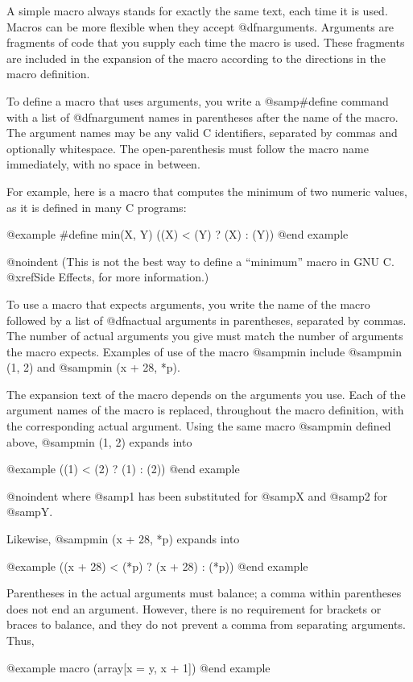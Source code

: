 {A simple macro always stands for exactly the same text, each time it is
used.  Macros can be more flexible when they accept @dfn{arguments}.
Arguments are fragments of code that you supply each time the macro is
used.  These fragments are included in the expansion of the macro according
to the directions in the macro definition.

To define a macro that uses arguments, you write a @samp{#define} command
with a list of @dfn{argument names} in parentheses after the name of the
macro.  The argument names may be any valid C identifiers, separated by
commas and optionally whitespace.  The open-parenthesis must follow the
macro name immediately, with no space in between.

For example, here is a macro that computes the minimum of two numeric
values, as it is defined in many C programs:

@example
#define min(X, Y)  ((X) < (Y) ? (X) : (Y))
@end example

@noindent
(This is not the best way to define a ``minimum'' macro in GNU C.
@xref{Side Effects}, for more information.)

To use a macro that expects arguments, you write the name of the macro
followed by a list of @dfn{actual arguments} in parentheses, separated by
commas.  The number of actual arguments you give must match the number of
arguments the macro expects.   Examples of use of the macro @samp{min}
include @samp{min (1, 2)} and @samp{min (x + 28, *p)}.

The expansion text of the macro depends on the arguments you use.
Each of the argument names of the macro is replaced, throughout the
macro definition, with the corresponding actual argument.  Using the
same macro @samp{min} defined above, @samp{min (1, 2)} expands into

@example
((1) < (2) ? (1) : (2))
@end example

@noindent
where @samp{1} has been substituted for @samp{X} and @samp{2} for @samp{Y}.

Likewise, @samp{min (x + 28, *p)} expands into

@example
((x + 28) < (*p) ? (x + 28) : (*p))
@end example

Parentheses in the actual arguments must balance; a comma within
parentheses does not end an argument.  However, there is no requirement
for brackets or braces to balance, and they do not prevent a comma from
separating arguments.  Thus,

@example
macro (array[x = y, x + 1])
@end example

}
